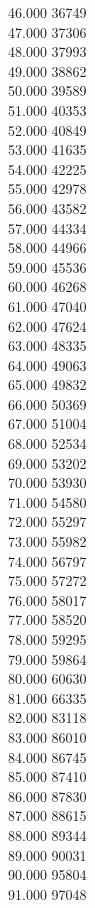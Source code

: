{ 46.000	36749 \\
 47.000	37306 \\
 48.000	37993 \\
 49.000	38862 \\
 50.000	39589 \\
 51.000	40353 \\
 52.000	40849 \\
 53.000	41635 \\
 54.000	42225 \\
 55.000	42978 \\
 56.000	43582 \\
 57.000	44334 \\
 58.000	44966 \\
 59.000	45536 \\
 60.000	46268 \\
 61.000	47040 \\
 62.000	47624 \\
 63.000	48335 \\
 64.000	49063 \\
 65.000	49832 \\
 66.000	50369 \\
 67.000	51004 \\
 68.000	52534 \\
 69.000	53202 \\
 70.000	53930 \\
 71.000	54580 \\
 72.000	55297 \\
 73.000	55982 \\
 74.000	56797 \\
 75.000	57272 \\
 76.000	58017 \\
 77.000	58520 \\
 78.000	59295 \\
 79.000	59864 \\
 80.000	60630 \\
 81.000	66335 \\
 82.000	83118 \\
 83.000	86010 \\
 84.000	86745 \\
 85.000	87410 \\
 86.000	87830 \\
 87.000	88615 \\
 88.000	89344 \\
 89.000	90031 \\
 90.000	95804 \\
 91.000	97048 \\
}
